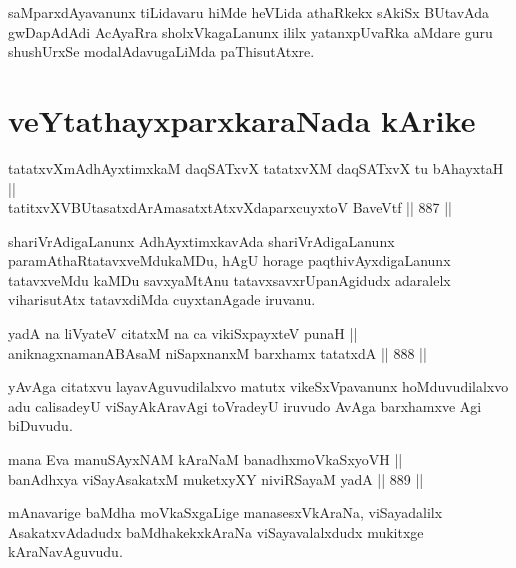 \begin{artha}
saMparxdAyavanunx tiLidavaru hiMde heVLida athaRkekx sAkiSx BUtavAda gwDapAdAdi AcAyaRra sholxVkagaLanunx ililx yatanxpUvaRka aMdare guru shushUrxSe modalAdavugaLiMda paThisutAtxre.
\end{artha}

\section*{veYtathayxparxkaraNada kArike}


\begin{shl}
tatatxvXmAdhAyxtimxkaM daqSATxvX tatatxvXM daqSATxvX tu bAhayxtaH ||  \\
tatitxvXVBUtasatxdArAmasatxtAtxvXdaparxcuyxtoV BaveVtf \hfill || 887 ||  
\end{shl}

\begin{artha}
shariVrAdigaLanunx AdhAyxtimxkavAda shariVrAdigaLanunx paramAthaRtatavxveMdukaMDu, hAgU horage paqthivAyxdigaLanunx tatavxveMdu kaMDu savxyaMtAnu tatavxsavxrUpanAgidudx adaralelx viharisutAtx tatavxdiMda cuyxtanAgade iruvanu.
\end{artha}


\begin{shl}
yadA na liVyateV citatxM na ca vikiSxpayxteV punaH || \\
aniknagxnamanABAsaM niSapxnanxM barxhamx tatatxdA \hfill || 888 ||  
\end{shl}

\begin{artha}
yAvAga citatxvu layavAguvudilalxvo matutx vikeSxVpavanunx hoMduvudilalxvo adu calisadeyU viSayAkAravAgi toVradeyU iruvudo AvAga barxhamxve Agi biDuvudu.
\end{artha}


\begin{shl}
mana Eva manuSAyxNAM kAraNaM banadhxmoVkaSxyoVH || \\
banAdhxya viSayAsakatxM muketxyXY niviRSayaM yadA \hfill || 889 ||  
\end{shl}

\begin{artha}
mAnavarige baMdha moVkaSxgaLige manasesxVkAraNa, viSayadalilx AsakatxvAdadudx baMdhakekxkAraNa viSayavalalxdudx mukitxge kAraNavAguvudu.
\end{artha}

